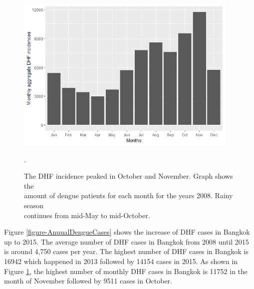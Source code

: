 \documentclass{bmcart}
\begin{document}
\begin{figure}[htbp]
	\begin{center}
		\includegraphics[width= 0.95\textwidth]{4-MonthlyDengueCases}
		\caption{The DHF incidence peaked in October and November. Graph shows the\\ amount of dengue patients for each month for the years 2008. Rainy season\\ continues from mid-May to mid-October.}.
		\label{figure-MonthlyDengueCases}
	\end{center}
\end{figure}


Figure \ref{figure-AnuualDengueCases} shows the increase of DHF cases in Bangkok up to 2015. The average number of  DHF cases in Bangkok from 2008 until 2015 is around 4,750 cases per year. The highest number of DHF cases in Bangkok is 16942 which happened in 2013 followed by 14154 cases in 2015. As shown in Figure \ref{figure-MonthlyDengueCases}, the highest number of monthly DHF cases in Bangkok is 11752 in the month of November followed by 9511 cases in October.
\end{document}
